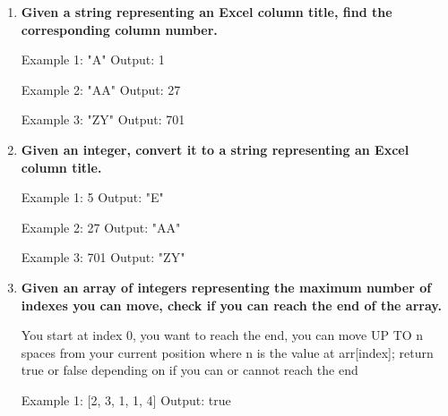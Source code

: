 \begin{enumerate}
\begin{console}
Example: 10
Output:  4
Explanation: 2, 3, 5, 7
\end{console}\newpage

\item \textbf{Given a string representing an Excel column title, find the corresponding column number.}

\begin{console}
Example 1: "A"
Output:    1

Example 2: "AA"
Output:    27

Example 3: "ZY"
Output:    701
\end{console}\newpage

\item \textbf{Given an integer, convert it to a string representing an Excel column title.}

\begin{console}
Example 1: 5
Output:    "E"

Example 2: 27
Output:    "AA"

Example 3: 701
Output:    "ZY"
\end{console}\newpage





\item \textbf{Given an array of integers representing the maximum number of indexes you can move, check if you can reach the end of the array.}

You start at index 0, you want to reach the end, you can move UP TO n spaces from your current position where n is the value at arr[index]; return true or false depending on if you can or cannot reach the end

\begin{console}
Example 1: [2, 3, 1, 1, 4]
Output:    true


\end{console}
\end{enumerate}

